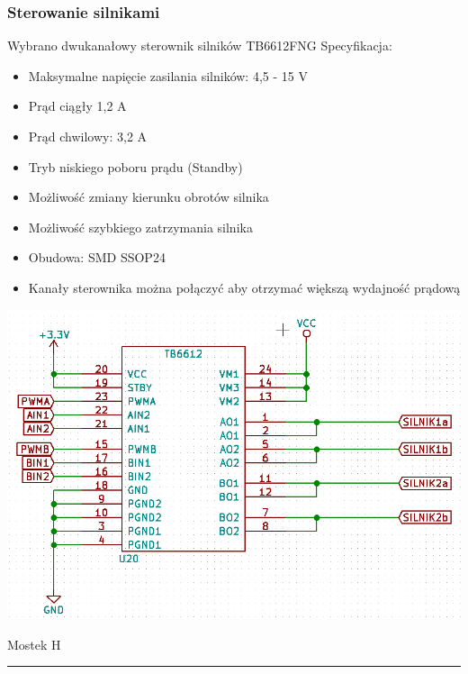 \documentclass[12pt,a4paper]{article}
\begin{document}
\subsubsection{Sterowanie silnikami}

Wybrano dwukanałowy sterownik silników TB6612FNG
\newline Specyfikacja:
\begin{itemize}
\item Maksymalne napięcie zasilania silników: 4,5 - 15 V
\item Prąd ciągły 1,2 A
\item Prąd chwilowy: 3,2 A 
\item Tryb niskiego poboru prądu (Standby)
\item Możliwość zmiany kierunku obrotów silnika
\item Możliwość szybkiego zatrzymania silnika
\item Obudowa: SMD SSOP24
\item Kanały sterownika można połączyć aby otrzymać większą wydajność prądową
\end{itemize}

\begin{center}
\includegraphics[scale=0.5]{tbek.png}
\caption{Mostek H}
\vspace*{1cm}
\noindent \rule{\linewidth}{0.4mm}
\end{center}
\end{document}
